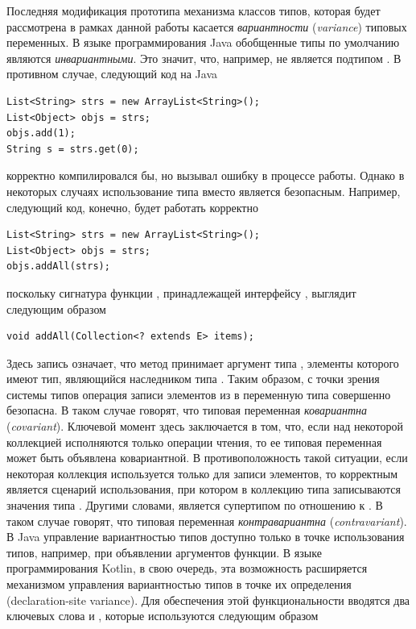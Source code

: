 Последняя модификация прототипа механизма классов типов, которая будет рассмотрена в рамках данной работы касается \emph{вариантности} (\emph{variance}) типовых переменных. В языке программирования Java обобщенные типы по умолчанию являются \emph{инвариантными}. Это значит, что, например,  не является подтипом . В противном случае, следующий код на Java 
\begin{lstlisting}[style=wo_caption]
List<String> strs = new ArrayList<String>();
List<Object> objs = strs;
objs.add(1);
String s = strs.get(0);
\end{lstlisting}
корректно компилировался бы, но вызывал ошибку в процессе работы. Однако в некоторых случаях использование типа  вместо  является безопасным. Например, следующий код, конечно, будет работать корректно
\begin{lstlisting}[style=wo_caption]
List<String> strs = new ArrayList<String>();
List<Object> objs = strs;
objs.addAll(strs);
\end{lstlisting}
поскольку сигнатура функции , принадлежащей интерфейсу , выглядит следующим образом
\begin{lstlisting}[style=wo_caption]
void addAll(Collection<? extends E> items);
\end{lstlisting}
Здесь запись  означает, что метод принимает аргумент типа , элементы которого имеют тип, являющийся наследником типа . Таким образом, с точки зрения системы типов операция записи элементов из  в переменную типа  совершенно безопасна. В таком случае говорят, что типовая переменная  \emph{ковариантна} (\emph{covariant}). Ключевой момент здесь заключается в том, что, если над некоторой коллекцией исполняются только операции чтения, то ее типовая переменная может быть объявлена ковариантной. В противоположность такой ситуации, если некоторая коллекция используется только для записи элементов, то корректным является сценарий использования, при котором в коллекцию типа  записываются значения типа . Другими словами,  является супертипом по отношению к . В таком случае говорят, что типовая переменная \emph{контравариантна} (\emph{contravariant}). В Java управление вариантностью типов доступно только в точке использования типов, например, при объявлении аргументов функции. В языке программирования Kotlin, в свою очередь, эта возможность расширяется механизмом управления вариантностью типов в точке их определения (declaration-site variance). Для обеспечения этой функциональности вводятся два ключевых слова  и , которые используются следующим образом
